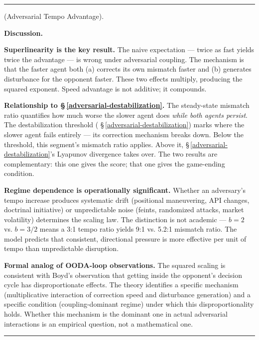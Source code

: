 \documentclass[11pt,oneside]{article}
\newcounter{claim}[section]
\renewcommand{\theclaim}{\thesection.\arabic{claim}}
\newenvironment{segment}[2]{%
  \refstepcounter{claim}%
  \bigskip\noindent\hrule\smallskip
  \noindent{\bfseries #1~\theclaim}\enskip(#2).\par\smallskip
  \noindent\ignorespaces
}{%
  \par\smallskip\noindent\hrule\bigskip
}
\newenvironment{theorem}[1][]{\begin{segment}{Theorem}{#1}}{\end{segment}}
\begin{document}
\begin{theorem}[Adversarial Tempo Advantage]
\medskip\noindent\textbf{Discussion.}


\textbf{Superlinearity is the key result.} The naive expectation — twice as fast yields twice the advantage — is wrong under adversarial coupling. The mechanism is that the faster agent both (a) corrects its own mismatch faster and (b) generates disturbance for the opponent faster. These two effects multiply, producing the squared exponent. Speed advantage is not additive; it compounds.

\textbf{Relationship to \S\,\ref{adversarial-destabilization}.} The steady-state mismatch ratio quantifies how much worse the slower agent does \textit{while both agents persist}. The destabilization threshold ( \S\,\ref{adversarial-destabilization}) marks where the slower agent fails entirely — its correction mechanism breaks down. Below the threshold, this segment's mismatch ratio applies. Above it, \S\,\ref{adversarial-destabilization}'s Lyapunov divergence takes over. The two results are complementary: this one gives the score; that one gives the game-ending condition.

\textbf{Regime dependence is operationally significant.} Whether an adversary's tempo increase produces systematic drift (positional maneuvering, API changes, doctrinal initiative) or unpredictable noise (feints, randomized attacks, market volatility) determines the scaling law. The distinction is not academic — $b = 2$ vs. $b = 3/2$ means a 3:1 tempo ratio yields 9:1 vs. 5.2:1 mismatch ratio. The model predicts that consistent, directional pressure is more effective per unit of tempo than unpredictable disruption.

\textbf{Formal analog of OODA-loop observations.} The squared scaling is consistent with Boyd's observation that getting inside the opponent's decision cycle has disproportionate effects. The theory identifies a specific mechanism (multiplicative interaction of correction speed and disturbance generation) and a specific condition (coupling-dominant regime) under which this disproportionality holds. Whether this mechanism is the dominant one in actual adversarial interactions is an empirical question, not a mathematical one.

\end{theorem}
\end{document}
